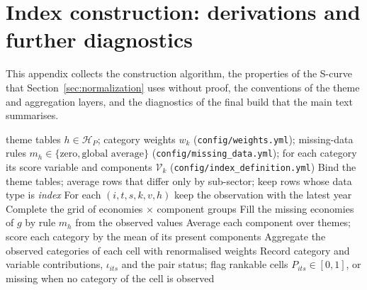 \section{Index construction: derivations and further diagnostics}\label{oa:normalization}

This appendix collects the construction algorithm, the properties of the S-curve that Section~\ref{sec:normalization}
uses without proof, the conventions of the theme and aggregation layers, and the diagnostics of
the final build that the main text summarises.

\begin{algorithm}[t]
  \caption{Construction of a pillar index $P\in\{\ES,\EO\}$ from its theme tables}
  \label{alg:pillar}
  \begin{algorithmic}[1]
    \Require theme tables $h\in\mathcal H_P$; category weights $w_k$
      (\texttt{config/weights.yml}); missing-data rules $m_h\in\{\text{zero},
      \text{global average}\}$ (\texttt{config/missing\_data.yml}); for each category its
      score variable and components $\mathcal V_{k}$ (\texttt{config/index\_definition.yml})
    \State Bind the theme tables; average rows that differ only by sub-sector; keep rows whose
      data type is \emph{index}
    \State For each $(i,t,s,k,v,h)$ keep the observation with the latest year
      \State Complete the grid of economies $\times$ component groups
          \State Fill the missing economies of $g$ by rule $m_h$ from the observed values
        \EndIf
      \EndFor
    \EndFor
    \State Average each component over themes; score each category by the mean of its present
      components 
    \State Aggregate the observed categories of each cell with renormalised weights
    \State Record category and variable contributions, $\iota_{its}$ and the pair status; flag
      rankable cells 
    \Ensure $P_{its}\in[0,1]$, or missing when no category of the cell is observed
  \end{algorithmic}
\end{algorithm}

